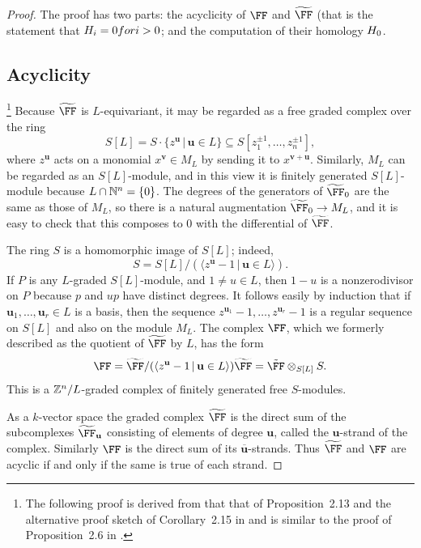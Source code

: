 \documentclass{amsart}
\begin{document}
\begin{proof}
The proof has two parts: the acyclicity of $\FF$ and $\tF$ (that is the statement that $H_i = 0 for i>0$; and the computation of their homology $H_0$.

\subsection{Acyclicity}
\footnote{The following proof is derived from that that of Proposition~2.13 and the alternative proof sketch of Corollary~2.15 in \cite{BCS+25} and is similar to the proof of Proposition~2.6 in \cite{BH25}.}
Because $\tF$ is $L$-equivariant, it may be regarded as a free graded complex over the ring
\[
S[L]=S\cdot \{z^{\mathbf{u}} \,|\, \mathbf{u}\in L\}\subseteq S[z_1^{\pm1},\ldots,z_n^{\pm1}],
\]
where $z^{\mathbf{u}}$ acts on a monomial $x^{\mathbf{v}}\in M_L$ by sending it to $x^{\mathbf{v}+\mathbf{u}}$. Similarly, $M_L$ can be regarded as an $S[L]$-module, and in this view it is finitely generated $S[L]$-module because $L\cap \mathbb N^n=\{0\}$. The degrees of the generators of
$\tF_0$ are the same as those of $M_L$, so there is a natural augmentation $\tF_0\to M_L$, and it is easy to check that this composes to 0 with the differential of $\tF$.

The ring $S$ is a homomorphic image of $S[L]$; indeed,
$$
S = S[L]/(\langle z^{\mathbf{u}}-1 \,|\, \mathbf{u}\in L\rangle).
$$
If $P$ is any $L$-graded $S[L]$-module, and $1 \neq u\in L$, then $1-u$ is a nonzerodivisor on $P$ because $p$ and $up$ have distinct degrees. It follows easily by induction that if $\mathbf{u}_1,\ldots,\mathbf{u}_r\in L$ is a basis, then the sequence $z^{\mathbf{u}_1}-1,\ldots,z^{\mathbf{u}_r}-1$ is a regular sequence on $S[L]$ and also on the module $M_L$. The complex
 $\FF$, which we formerly described as the quotient of $\tF$ by $L$,  has the form
 $$
 \FF = \tF/(\langle z^{\mathbf{u}}-1 \,|\, \mathbf{u}\in L\rangle)\tF =   \tilde \FF \otimes_{S[L]} S.
$$
This is a $\mathbb Z^n/L$-graded complex of finitely generated free $S$-modules.

As a $k$-vector space the graded complex $\tF$ is the direct sum of the subcomplexes $\tF_{\mathbf u}$ consisting of elements of degree $\mathbf u$, called the $\mathbf u$-strand of the complex. Similarly $\FF$ is the direct sum of its $\overline{\mathbf u}$-strands. Thus $\tF$ and $\FF$ are acyclic if and only if the same is true of each strand. 


\end{proof}
\end{document}
